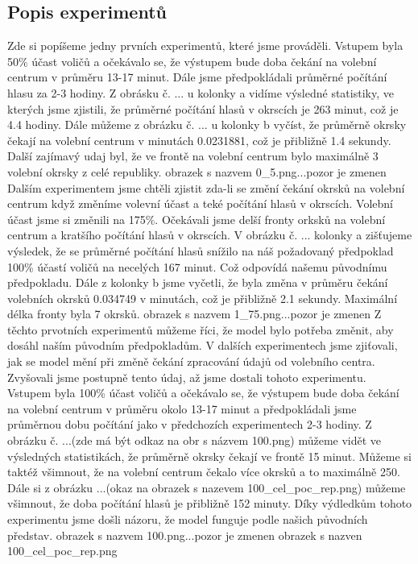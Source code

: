 \documentclass[12pt,a4paper,titlepage,final]{article}
\begin{document}
\subsection{Popis experimentů}
Zde si popíšeme jedny prvních experimentů, které jsme prováděli.
Vstupem byla 50\% účast voličů a očekávalo se, že výstupem bude doba čekání na volební centrum v průměru 13-17 minut. Dále jsme předpokládali průměrné počítání hlasu za 2-3 hodiny. Z obrásku č. ... u kolonky a vidíme výsledné statistiky, ve kterých jsme zjistili, že průměrné počítání hlasů v okrscích je 263 minut, což je 4.4 hodiny. Dále můžeme z obrázku č. ... u kolonky b vyčíst, že průměrně okrsky čekají na volební centrum v minutách 0.0231881, což je přibližně 1.4 sekundy. Další zajímavý udaj byl, že ve frontě na volební centrum bylo maximálně 3 volební okrsky z celé republiky. \newline
\newline
obrazek s nazvem 0\_5.png...pozor je zmenen
\newline
\newline
\newpage
Dalším experimentem jsme chtěli zjistit zda-li se změní čekání okrsků na volební centrum když změníme volevní účast a teké počítání hlasů v okrscích. Volební účast jsme si změnili na 175\%. Očekávali jsme delší fronty orksků na volební centrum a kratšího počítání hlasů v okrscích. V obrázku č. ... kolonky a zišťujeme výsledek, že se průměrné počítání hlasů snížilo na náš požadovaný předpoklad 100\% účastí voličů na necelých 167 minut. Což odpovídá našemu původnímu předpokladu. Dále z kolonky b jsme vyčetli, že byla změna v průměru čekání volebních okrsků 0.034749 v minutách, což je přibližně 2.1 sekundy. Maximální délka fronty byla 7 okrsků. \newline
\newline
obrazek s nazvem 1\_75.png...pozor je zmenen
\newline
\newline
Z těchto prvotních experimentů můžeme říci, že model bylo potřeba změnit, aby dosáhl naším původním předpokladům. V dalších experimentech jsme zjiťovali, jak se model mění při změně čekání zpracování údajů od volebního centra. Zvyšovali jsme postupně tento údaj, až jsme dostali tohoto experimentu.
\newpage
Vstupem byla 100\% účast voličů a očekávalo se, že výstupem bude doba čekání na volební centrum v průměru okolo 13-17 minut a předpokládali jsme průměrnou dobu počítání jako v předchozích experimentech 2-3 hodiny. Z obrázku č. ...(zde má být odkaz na obr s názvem 100.png)  můžeme vidět ve výsledných statistikách, že průměrně okrsky čekají ve frontě 15 minut. Můžeme si taktéž všimnout, že na volební centrum čekalo více okrsků a to maximálně 250. Dále si z obrázku ...(okaz na obrazek s nazevem 100\_cel\_poc\_rep.png) můžeme všimnout, že doba počítání hlasů je přibližně 152 minuty. Díky výdledkům tohoto experimentu jsme došli názoru, že model funguje podle našich původních představ.
\newline
\newline
obrazek s nazvem 100.png...pozor je zmenen
obrazek s nazven 100\_cel\_poc\_rep.png
\newline
\newline
\newpage
\end{document}
